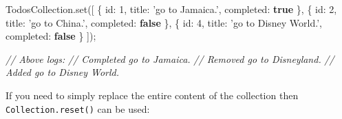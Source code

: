 \documentclass[9pt]{book}
\newenvironment{Shaded}{}{}
\newcommand{\KeywordTok}[1]{\textcolor[rgb]{0.00,0.44,0.13}{\textbf{{#1}}}}
\newcommand{\DataTypeTok}[1]{\textcolor[rgb]{0.56,0.13,0.00}{{#1}}}
\newcommand{\DecValTok}[1]{\textcolor[rgb]{0.25,0.63,0.44}{{#1}}}
\newcommand{\StringTok}[1]{\textcolor[rgb]{0.25,0.44,0.63}{{#1}}}
\newcommand{\CommentTok}[1]{\textcolor[rgb]{0.38,0.63,0.69}{\textit{{#1}}}}
\newcommand{\OtherTok}[1]{\textcolor[rgb]{0.00,0.44,0.13}{{#1}}}
\newcommand{\FunctionTok}[1]{\textcolor[rgb]{0.02,0.16,0.49}{{#1}}}
\newcommand{\NormalTok}[1]{{#1}}
\begin{document}
\begin{Shaded}
\begin{Highlighting}[]
\OtherTok{TodosCollection}\NormalTok{.}\FunctionTok{set}\NormalTok{([}
    \NormalTok{\{ }\DataTypeTok{id}\NormalTok{: }\DecValTok{1}\NormalTok{, }\DataTypeTok{title}\NormalTok{: }\StringTok{'go to Jamaica.'}\NormalTok{, }\DataTypeTok{completed}\NormalTok{: }\KeywordTok{true} \NormalTok{\},}
    \NormalTok{\{ }\DataTypeTok{id}\NormalTok{: }\DecValTok{2}\NormalTok{, }\DataTypeTok{title}\NormalTok{: }\StringTok{'go to China.'}\NormalTok{, }\DataTypeTok{completed}\NormalTok{: }\KeywordTok{false} \NormalTok{\},}
    \NormalTok{\{ }\DataTypeTok{id}\NormalTok{: }\DecValTok{4}\NormalTok{, }\DataTypeTok{title}\NormalTok{: }\StringTok{'go to Disney World.'}\NormalTok{, }\DataTypeTok{completed}\NormalTok{: }\KeywordTok{false} \NormalTok{\}}
\NormalTok{]);}

\CommentTok{// Above logs:}
\CommentTok{// Completed go to Jamaica.}
\CommentTok{// Removed go to Disneyland.}
\CommentTok{// Added go to Disney World.}
\end{Highlighting}
\end{Shaded}

If you need to simply replace the entire content of the collection then
\texttt{Collection.reset()} can be used:
\end{document}
